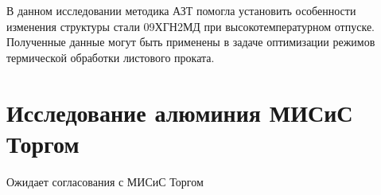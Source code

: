 В данном исследовании методика АЗТ помогла установить особенности изменения структуры стали 09ХГН2МД при высокотемпературном отпуске. Полученные данные могут быть применены в задаче оптимизации режимов термической обработки листового проката.

\FloatBarrier

\section{Исследование алюминия МИСиС Торгом}\label{sec:ch4/sect4}

Ожидает согласования с МИСиС Торгом

\FloatBarrier
\clearpage










